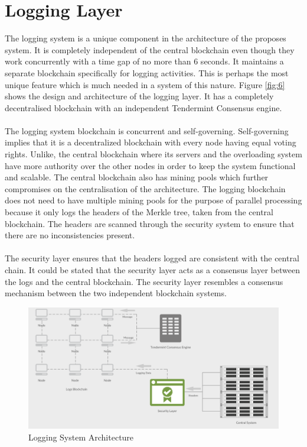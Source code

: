 \documentclass[a4paper,twoside,phd]{BYUPhys}
\begin{document}
\section{Logging Layer}
The logging system is a unique component in the architecture of the proposes system. It is completely independent of the central blockchain even though they work concurrently with a time gap of no more than 6 seconds. It maintains a separate blockchain specifically for logging activities. This is perhaps the most unique feature which is much needed in a system of this nature. Figure \ref{fig:6} shows the design and architecture of the logging layer. It has a completely decentralised blockchain with an independent Tendermint Consensus engine.
\\
\\
The logging system blockchain is concurrent and self-governing. Self-governing implies that it is a decentralized blockchain with every node having equal voting rights. Unlike, the central blockchain where its servers and the overloading system have more authority over the other nodes in order to keep the system functional and scalable. The central blockchain also has mining pools which further compromises on the centralisation of the architecture. The logging blockchain does not need to have multiple mining pools for the purpose of parallel processing because it only logs the headers of the Merkle tree, taken from the central blockchain. The headers are scanned through the security system to ensure that there are no inconsistencies present.\\
\\
The security layer ensures that the headers logged are consistent with the central chain. It could be stated that the security layer acts as a consensus layer between the logs and the central blockchain. The security layer resembles a consensus mechanism between the two independent blockchain systems.
\begin{figure}
  \includegraphics[width=\linewidth]{logging_layer.png}
  \caption{Logging System Architecture}
  \label{fig:2}
\end{figure}
\end{document}
